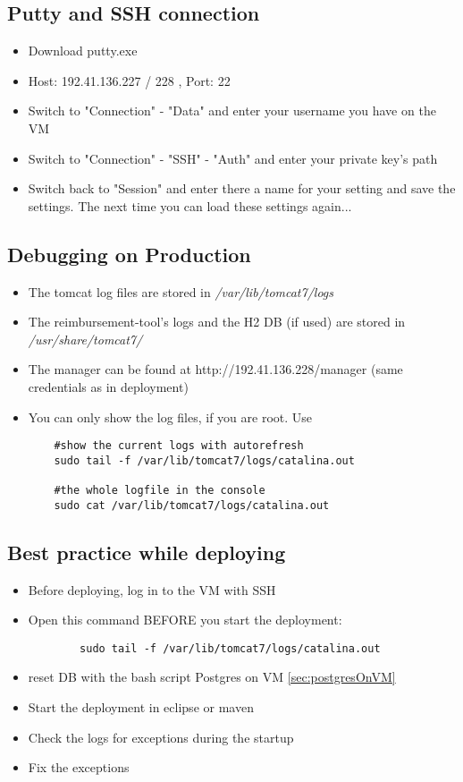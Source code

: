 \subsection{Putty and SSH connection}
\begin{itemize}
	\item Download putty.exe
	\item Host: 192.41.136.227 / 228 , Port: 22
	\item Switch to "Connection" - "Data" and enter your username you have on the VM
	\item Switch to "Connection" - "SSH" - "Auth" and enter your private key's path
	\item Switch back to "Session" and enter there a name for your setting and save the settings. The next time you can load these settings again...
\end{itemize} 


\subsection{Debugging on Production}
\begin{itemize}
	\item The tomcat log files are stored in \newline
	\textit{ /var/lib/tomcat7/logs}
	\item The reimbursement-tool's logs and the H2 DB (if used) are stored in \newline \textit{/usr/share/tomcat7/}
	\item The manager can be found at http://192.41.136.228/manager (same credentials as in deployment)
	\item You can only show the log files, if you are root. Use 
	\begin{lstlisting}
	#show the current logs with autorefresh
	sudo tail -f /var/lib/tomcat7/logs/catalina.out
	
	#the whole logfile in the console
	sudo cat /var/lib/tomcat7/logs/catalina.out	\end{lstlisting}
\end{itemize}

\subsection{Best practice while deploying}
\begin{itemize}
	\item Before deploying, log in to the VM with SSH
	\item Open this command BEFORE you start the deployment:
	\begin{lstlisting}
		sudo tail -f /var/lib/tomcat7/logs/catalina.out
	\end{lstlisting}
	\item reset DB with the bash script Postgres on VM \ref{sec:postgresOnVM}
	\item Start the deployment in eclipse or maven
	\item Check the logs for exceptions during the startup
	\item Fix the exceptions
\end{itemize}

